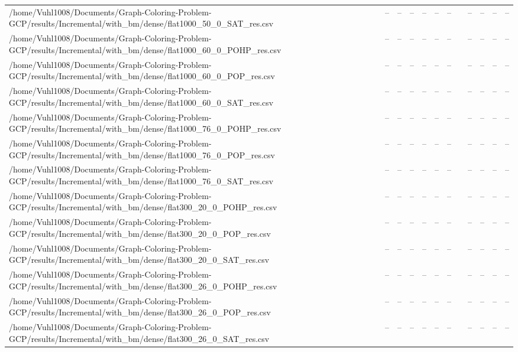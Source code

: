 \begin{table}[htbp]
\begin{tabular}{llllllllllll}
/home/Vuhl1008/Documents/Graph-Coloring-Problem-GCP/results/Incremental/with\_bm/dense/flat1000\_50\_0\_SAT\_res.csv & -- & -- & -- & -- & -- & -- & {} & -- & -- & -- & -- \\
/home/Vuhl1008/Documents/Graph-Coloring-Problem-GCP/results/Incremental/with\_bm/dense/flat1000\_60\_0\_POHP\_res.csv & -- & -- & -- & -- & -- & -- & {} & -- & -- & -- & -- \\
/home/Vuhl1008/Documents/Graph-Coloring-Problem-GCP/results/Incremental/with\_bm/dense/flat1000\_60\_0\_POP\_res.csv & -- & -- & -- & -- & -- & -- & {} & -- & -- & -- & -- \\
/home/Vuhl1008/Documents/Graph-Coloring-Problem-GCP/results/Incremental/with\_bm/dense/flat1000\_60\_0\_SAT\_res.csv & -- & -- & -- & -- & -- & -- & {} & -- & -- & -- & -- \\
/home/Vuhl1008/Documents/Graph-Coloring-Problem-GCP/results/Incremental/with\_bm/dense/flat1000\_76\_0\_POHP\_res.csv & -- & -- & -- & -- & -- & -- & {} & -- & -- & -- & -- \\
/home/Vuhl1008/Documents/Graph-Coloring-Problem-GCP/results/Incremental/with\_bm/dense/flat1000\_76\_0\_POP\_res.csv & -- & -- & -- & -- & -- & -- & {} & -- & -- & -- & -- \\
/home/Vuhl1008/Documents/Graph-Coloring-Problem-GCP/results/Incremental/with\_bm/dense/flat1000\_76\_0\_SAT\_res.csv & -- & -- & -- & -- & -- & -- & {} & -- & -- & -- & -- \\
/home/Vuhl1008/Documents/Graph-Coloring-Problem-GCP/results/Incremental/with\_bm/dense/flat300\_20\_0\_POHP\_res.csv & -- & -- & -- & -- & -- & -- & {} & -- & -- & -- & -- \\
/home/Vuhl1008/Documents/Graph-Coloring-Problem-GCP/results/Incremental/with\_bm/dense/flat300\_20\_0\_POP\_res.csv & -- & -- & -- & -- & -- & -- & {} & -- & -- & -- & -- \\
/home/Vuhl1008/Documents/Graph-Coloring-Problem-GCP/results/Incremental/with\_bm/dense/flat300\_20\_0\_SAT\_res.csv & -- & -- & -- & -- & -- & -- & {} & -- & -- & -- & -- \\
/home/Vuhl1008/Documents/Graph-Coloring-Problem-GCP/results/Incremental/with\_bm/dense/flat300\_26\_0\_POHP\_res.csv & -- & -- & -- & -- & -- & -- & {} & -- & -- & -- & -- \\
/home/Vuhl1008/Documents/Graph-Coloring-Problem-GCP/results/Incremental/with\_bm/dense/flat300\_26\_0\_POP\_res.csv & -- & -- & -- & -- & -- & -- & {} & -- & -- & -- & -- \\
/home/Vuhl1008/Documents/Graph-Coloring-Problem-GCP/results/Incremental/with\_bm/dense/flat300\_26\_0\_SAT\_res.csv & -- & -- & -- & -- & -- & -- & {} & -- & -- & -- & -- \\

\end{tabular}
\end{table}
